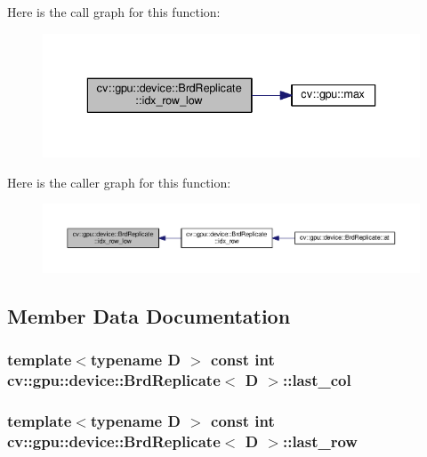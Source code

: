 Here is the call graph for this function\-:\nopagebreak
\begin{figure}[H]
\begin{center}
\leavevmode
\includegraphics[width=336pt]{structcv_1_1gpu_1_1device_1_1BrdReplicate_a8b76a54ae4e547c2fe579b0b3499f840_cgraph}
\end{center}
\end{figure}




Here is the caller graph for this function\-:\nopagebreak
\begin{figure}[H]
\begin{center}
\leavevmode
\includegraphics[width=350pt]{structcv_1_1gpu_1_1device_1_1BrdReplicate_a8b76a54ae4e547c2fe579b0b3499f840_icgraph}
\end{center}
\end{figure}




\subsection{Member Data Documentation}
\hypertarget{structcv_1_1gpu_1_1device_1_1BrdReplicate_a5778af0f4fd7fe97cddcf9db5b09a0c3}{
\subsubsection[{last\-\_\-col}]{\setlength{\rightskip}{0pt plus 5cm}template$<$typename D $>$ const int {\bf cv\-::gpu\-::device\-::\-Brd\-Replicate}$<$ D $>$\-::last\-\_\-col}}\label{structcv_1_1gpu_1_1device_1_1BrdReplicate_a5778af0f4fd7fe97cddcf9db5b09a0c3}
\hypertarget{structcv_1_1gpu_1_1device_1_1BrdReplicate_adf9331d9150edf1a5108d4c2188818ec}{
\subsubsection[{last\-\_\-row}]{\setlength{\rightskip}{0pt plus 5cm}template$<$typename D $>$ const int {\bf cv\-::gpu\-::device\-::\-Brd\-Replicate}$<$ D $>$\-::last\-\_\-row}}\label{structcv_1_1gpu_1_1device_1_1BrdReplicate_adf9331d9150edf1a5108d4c2188818ec}



